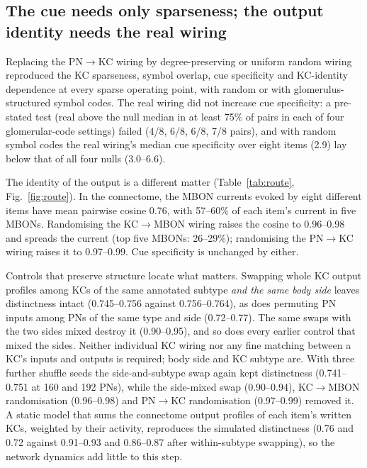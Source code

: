 \documentclass[conference]{IEEEtran}
\begin{document}
\subsection{The cue needs only sparseness; the output identity needs the real wiring}
Replacing the PN$\rightarrow$KC wiring by degree-preserving or uniform random
wiring reproduced the KC sparseness, symbol overlap, cue specificity and
KC-identity dependence at every sparse operating point, with random or with
glomerulus-structured symbol codes. The real wiring did not increase cue
specificity: a pre-stated test (real above the null median in at least 75\% of
pairs in each of four glomerular-code settings) failed (4/8, 6/8, 6/8, 7/8
pairs), and with random symbol codes the real wiring's median cue specificity
over eight items (2.9) lay below that of all four nulls (3.0--6.6).

The identity of the output is a different matter (Table~\ref{tab:route},
Fig.~\ref{fig:route}). In the connectome, the MBON currents evoked by eight
different items have mean pairwise cosine 0.76, with 57--60\% of each item's
current in five MBONs. Randomising the KC$\rightarrow$MBON wiring raises the
cosine to 0.96--0.98 and spreads the current (top five MBONs: 26--29\%);
randomising the PN$\rightarrow$KC wiring raises it to 0.97--0.99. Cue
specificity is unchanged by either.

Controls that preserve structure locate what matters. Swapping whole KC output
profiles among KCs of the same annotated subtype \emph{and the same body side}
leaves distinctness intact (0.745--0.756 against 0.756--0.764), as does
permuting PN inputs among PNs of the same type and side (0.72--0.77). The same
swaps with the two sides mixed destroy it (0.90--0.95), and so does every
earlier control that mixed the sides. Neither individual KC wiring nor any
fine matching between a KC's inputs and outputs is required; body side and KC
subtype are. With three further shuffle seeds the side-and-subtype swap again
kept distinctness (0.741--0.751 at 160 and 192 PNs), while the side-mixed swap
(0.90--0.94), KC$\rightarrow$MBON randomisation (0.96--0.98) and
PN$\rightarrow$KC randomisation (0.97--0.99) removed it. A static model that sums the connectome output profiles of each
item's written KCs, weighted by their activity, reproduces the simulated
distinctness (0.76 and 0.72 against 0.91--0.93 and 0.86--0.87 after
within-subtype swapping), so the network dynamics add little to this step.
\end{document}
